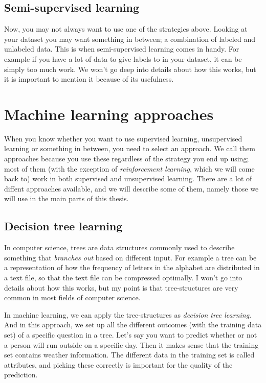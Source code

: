 \subsection{Semi-supervised learning}
Now, you may not always want to use one of the strategies above. Looking at your dataset you may want something in between; 
a combination of labeled and unlabeled data. This is when semi-supervised learning comes in handy. For example if you have 
a lot of data to give labels to in your dataset, it can be simply too much work. We won't go deep into details about how this works, 
but it is important to mention it because of its usefulness.


\section{Machine learning approaches}
When you know whether you want to use supervised learning, unsupervised learning or something in between, you need to select an approach.
We call them approaches because you use these regardless of the strategy you end up using; most of them (with the exception of \textit{reinforcement learning}, 
which we will come back to) work in both supervised and unsupervised learning. There are a lot of diffent approaches available, and we will describe some of them,
namely those we will use in the main parts of this thesis.

\subsection{Decision tree learning}
In computer science, trees are data structures commonly used to describe something that \textit{branches out} based on different input. 
For example a tree can be a representation of how the frequency of letters in the alphabet are distributed in a text file, so that the text file 
can be compressed optimally. I won't go into details about how this works, but my point is that tree-structures are very common in most fields of 
computer science. 

In machine learning, we can apply the tree-structures as \textit{decision tree learning}. And in this approach, we set up all the different outcomes
(with the training data set) of a specific question in a tree. Let's say you want to predict whether or not a person will run outside on a specific day.
Then it makes sense that the training set contains weather information. The different data in the training set is called attributes, and picking these 
correctly is important for the quality of the prediction.

